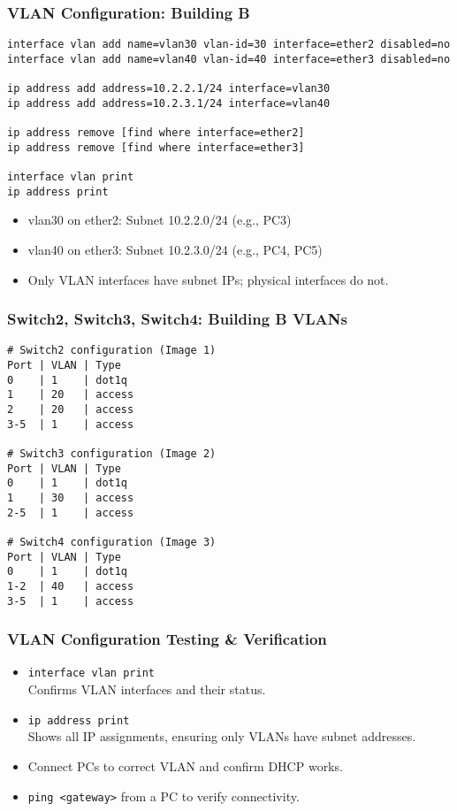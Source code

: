 \documentclass{beamer}
\begin{document}
\begin{frame}[fragile,label=vlans-b]
\frametitle{VLAN Configuration: Building B}
\begin{lstlisting}
interface vlan add name=vlan30 vlan-id=30 interface=ether2 disabled=no
interface vlan add name=vlan40 vlan-id=40 interface=ether3 disabled=no

ip address add address=10.2.2.1/24 interface=vlan30
ip address add address=10.2.3.1/24 interface=vlan40

ip address remove [find where interface=ether2]
ip address remove [find where interface=ether3]

interface vlan print
ip address print
\end{lstlisting}
\begin{itemize}
    \item vlan30 on ether2: Subnet 10.2.2.0/24 (e.g., PC3)
    \item vlan40 on ether3: Subnet 10.2.3.0/24 (e.g., PC4, PC5)
    \item Only VLAN interfaces have subnet IPs; physical interfaces do not.
\end{itemize}
\end{frame}

\begin{frame}[fragile]
\frametitle{Switch2, Switch3, Switch4: Building B VLANs}
\begin{lstlisting}
# Switch2 configuration (Image 1)
Port | VLAN | Type
0    | 1    | dot1q
1    | 20   | access
2    | 20   | access
3-5  | 1    | access

# Switch3 configuration (Image 2)
Port | VLAN | Type
0    | 1    | dot1q
1    | 30   | access
2-5  | 1    | access

# Switch4 configuration (Image 3)
Port | VLAN | Type
0    | 1    | dot1q
1-2  | 40   | access
3-5  | 1    | access
\end{lstlisting}
\end{frame}

\begin{frame}[fragile]
  \frametitle{VLAN Configuration Testing \& Verification}
  \begin{itemize}
      \item \texttt{interface vlan print} \\
      Confirms VLAN interfaces and their status.
      \item \texttt{ip address print} \\
      Shows all IP assignments, ensuring only VLANs have subnet addresses.
      \item Connect PCs to correct VLAN and confirm DHCP works.
      \item \texttt{ping <gateway>} from a PC to verify connectivity.
  \end{itemize}
  \end{frame}
  
\end{document}
